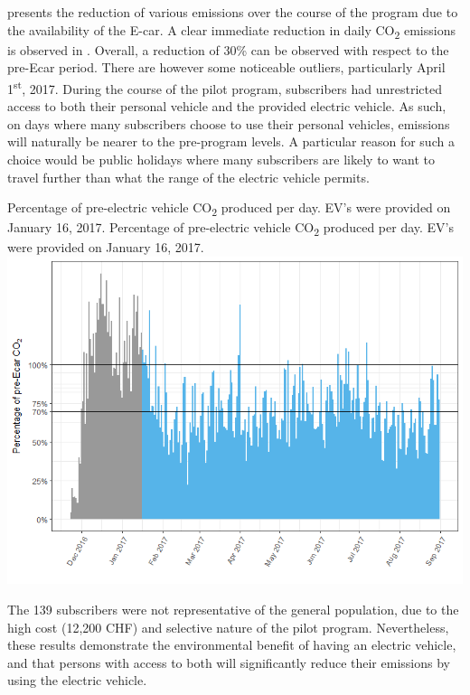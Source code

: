  presents the reduction of various emissions over the course of the program due to the availability of the E-car. 
A clear immediate reduction in daily CO\textsubscript{2} emissions is observed in . 
Overall, a reduction of 30\% can be observed with respect to the pre-Ecar period. 
There are however some noticeable outliers, particularly April 1\textsuperscript{st}, 2017. 
During the course of the pilot program, subscribers had unrestricted access to both their personal vehicle and the provided electric vehicle. 
As such, on days where many subscribers choose to use their personal vehicles, emissions will naturally be nearer to the pre-program levels. 
A particular reason for such a choice would be public holidays where many subscribers are likely to want to travel further than what the range of the electric vehicle permits.

\createfigure%
{Percentage of pre-electric vehicle CO\textsubscript{2} produced per day. EV's were provided on January 16, 2017. }%
{Percentage of pre-electric vehicle CO\textsubscript{2} produced per day. EV's were provided on January 16, 2017. }%
{\label{fig:green-class-reduction}}%
{\includegraphics[width=1.0\textwidth, angle=0]{figures/green_class_pollutant_reductions_daily}}%
{}

The 139 subscribers were not representative of the general population, due to the high cost (12,200 CHF) and selective nature of the pilot program.
Nevertheless, these results demonstrate the environmental benefit of having an electric vehicle, and that persons with access to both will significantly reduce their emissions by using the electric vehicle.

